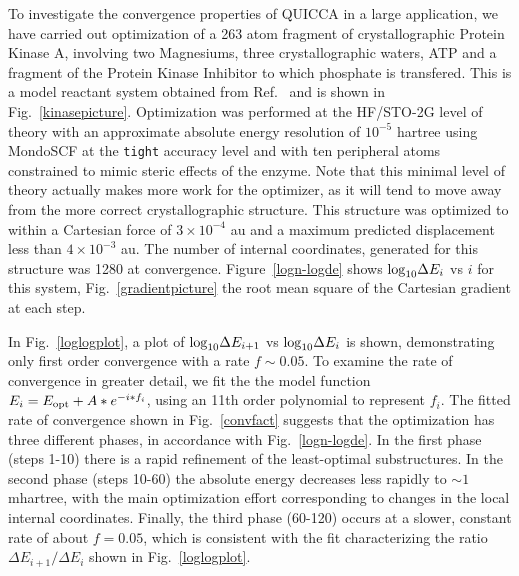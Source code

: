 \documentclass[prl,twocolumn,showpacs,twocolumngrid,superbib]{revtex4}
\begin{document}
To investigate the convergence properties of QUICCA in a large application, we have carried out
optimization of a 263 atom fragment of crystallographic Protein Kinase A, involving two Magnesiums,
three crystallographic waters, ATP and a fragment of the Protein Kinase Inhibitor to which phosphate 
is transfered. This is a model reactant system obtained from Ref.~ and is shown in 
Fig.~\ref{kinasepicture}.  Optimization was performed at the HF/STO-2G level of theory with an 
approximate absolute energy resolution of $10^{-5}$ hartree using MondoSCF \cite{MondoSCF} at the 
{\tt tight} accuracy level and with ten peripheral atoms  constrained to mimic steric effects of the enzyme.  
Note that this minimal level of theory actually makes more work for the optimizer, as it will tend to 
move away from the more correct crystallographic structure.   This structure was optimized to within a 
Cartesian force of $3\times10^{-4}$ au and a maximum predicted displacement less than $4\times10^{-3}$ au.
The number of internal coordinates, generated for this structure was 1280 at convergence.  Figure~\ref{logn-logde} 
shows ${\rm log}_{10} \Delta E_i$ vs $i$ for this system, Fig.~\ref{gradientpicture} the root mean square 
of the Cartesian gradient at each step.

In Fig.~\ref{loglogplot}, a plot of ${\rm log}_{10}{\Delta E_{i+1}}$ vs ${\rm log }_{10} {\Delta E_{i}}$ 
is shown, demonstrating only first order convergence with a rate $f \sim 0.05$.   To examine the rate of convergence
in greater detail, we fit the the model function $E_{i}=E_{\rm opt}+A*e^{-i * f_i}$, using  
an 11th order polynomial to represent $f_i$.  The fitted rate of convergence shown in Fig.~\ref{convfact}
suggests that the optimization has three different phases, in accordance with Fig.~\ref{logn-logde}.
In the first phase (steps 1-10) there is a rapid refinement of the least-optimal substructures. In the 
second phase (steps 10-60) the absolute energy decreases less rapidly to $\sim 1$ mhartree, with the  
main optimization effort corresponding to changes in the local internal coordinates. Finally, the third phase 
(60-120) occurs at a slower, constant rate of about $f=0.05$, which is consistent with the fit characterizing 
the ratio ${\Delta E_{i+1}}/{\Delta E_{i}}$ shown in Fig.~\ref{loglogplot}.
\end{document}

